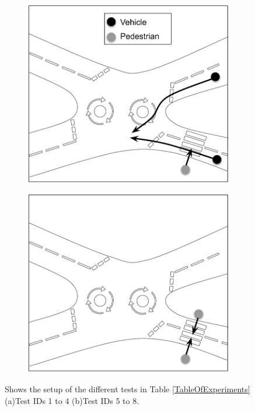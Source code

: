 \begin{figure}[h]
    \centering
    \begin{subfigure}{.24\textwidth}
        \includegraphics[width=1\textwidth]{Other/Figures/TestCasesDiagram_a.pdf}
        \caption{}
        \label{Test_a}
    \end{subfigure}
    \begin{subfigure}{.24\textwidth}
        \includegraphics[width=1\textwidth]{Other/Figures/TestCasesDiagram_b.pdf}
        \caption{}
        \label{Test_b}
    \end{subfigure}
    \caption{Shows the setup of the different tests in Table \ref{TableOfExperiments} (a)Test IDs 1 to 4 (b)Test IDs 5 to 8.}
\end{figure}


